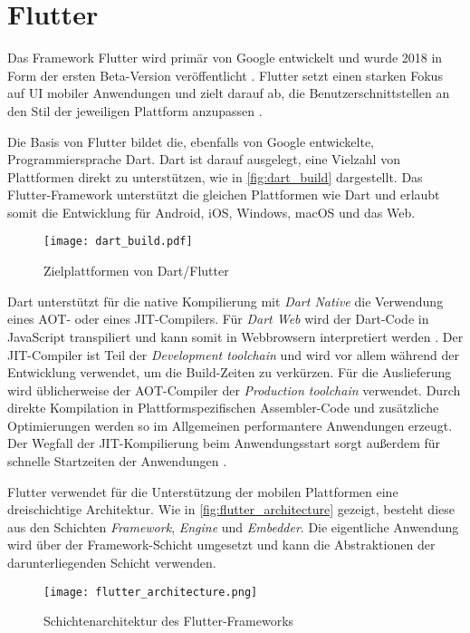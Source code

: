 \section{Flutter}
\label{sec:Frameworks_Flutter}

Das Framework Flutter wird primär von Google entwickelt und wurde 2018 in Form der ersten Beta-Version veröffentlicht \cite{Sharma_Flutter}.
Flutter setzt einen starken Fokus auf \ac{UI} mobiler Anwendungen und zielt darauf ab, die Benutzerschnittstellen an den Stil der jeweiligen Plattform anzupassen \cite{Flutter_Architektur}.


Die Basis von Flutter bildet die, ebenfalls von Google entwickelte, Programmiersprache Dart.
Dart ist darauf ausgelegt, eine Vielzahl von Plattformen direkt zu unterstützen, wie in \autoref{fig:dart_build} dargestellt.
Das Flutter-Framework unterstützt die gleichen Plattformen wie Dart und erlaubt somit die Entwicklung für Android, iOS, Windows, macOS und das Web.
\begin{figure}[ht]
    \centering
    \texttt{[image: dart\_build.pdf]}
    \caption{Zielplattformen von Dart/Flutter \cite{Dart_Overview}}
    \label{fig:dart_build}
\end{figure}


Dart unterstützt für die native Kompilierung mit \textit{Dart Native} die Verwendung eines \ac{AOT}- oder eines \ac{JIT}-Compilers.
Für \textit{Dart Web} wird der Dart-Code in JavaScript transpiliert und kann somit in Webbrowsern interpretiert werden \cite{Flutter_Architektur}.
Der \ac{JIT}-Compiler ist Teil der \textit{Development toolchain} und wird vor allem während der Entwicklung verwendet, um die Build-Zeiten zu verkürzen.
Für die Auslieferung wird üblicherweise der \ac{AOT}-Compiler der \textit{Production toolchain} verwendet.
Durch direkte Kompilation in Plattformspezifischen Assembler-Code und zusätzliche Optimierungen werden so im Allgemeinen performantere Anwendungen erzeugt.
Der Wegfall der \ac{JIT}-Kompilierung beim Anwendungsstart sorgt außerdem für schnelle Startzeiten der Anwendungen \cite{Dart_Overview}.



Flutter verwendet für die Unterstützung der mobilen Plattformen eine dreischichtige Architektur.
Wie in \autoref{fig:flutter_architecture} gezeigt, besteht diese aus den Schichten \textit{Framework}, \textit{Engine} und \textit{Embedder}.
Die eigentliche Anwendung wird über der Framework-Schicht umgesetzt und kann die Abstraktionen der darunterliegenden Schicht verwenden.
\begin{figure}[h]
    \centering
    \texttt{[image: flutter\_architecture.png]}
    \caption{Schichtenarchitektur des Flutter-Frameworks \cite{Flutter_Architektur}}
    \label{fig:flutter_architecture}
\end{figure}

